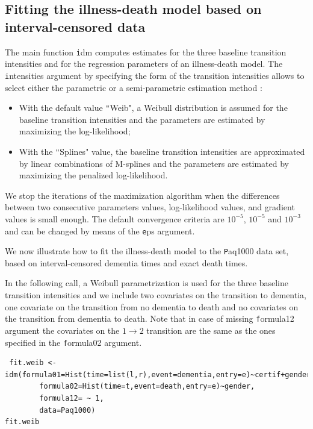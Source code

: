 \documentclass{article}
\newcommand{\code}[1]{{\texttt #1}}
\begin{document}
\subsection{Fitting the illness-death model based on interval-censored data}
\label{sec-5-3}

The main function \code{idm} computes estimates for the three baseline
transition intensities and for the regression parameters of an
illness-death model.  The \code{intensities} argument by specifying
the form of the transition intensities allows to select either the
parametric or a semi-parametric estimation method :

\begin{itemize}
\item With the default value \code{"Weib"}, a Weibull distribution is
assumed for the baseline transition intensities and the parameters
are estimated by maximizing the log-likelihood;
\item With the \code{"Splines"} value, the baseline transition
intensities are approximated by linear combinations of
M-splines and the parameters are estimated by
maximizing the penalized log-likelihood.
\end{itemize}

We stop the iterations of the maximization algorithm when the differences 
between two consecutive
parameters values, log-likelihood values, and gradient values is small
enough.  The default convergence criteria are $10^{-5}$, $10^{-5}$ and
$10^{-3}$ and can be changed by means of the \code{eps} argument.

We now illustrate how to fit the illness-death model to the 
\code{Paq1000} data set, based on 
interval-censored dementia times and exact death times.

\bigskip

In the following call, a Weibull parametrization is used for the three baseline 
transition intensities and we include two covariates on the transition to dementia,
one covariate on the transition from no dementia to death and no covariates 
on the transition from dementia to death. Note that in case of missing \code{formula12}
argument the covariates on the $1 \rightarrow 2$ transition are the same as 
the ones specified in the  \code{formula02} argument.

\lstset{basicstyle=\small\tt,numbers=left,language=R}
\begin{lstlisting}
 fit.weib <- idm(formula01=Hist(time=list(l,r),event=dementia,entry=e)~certif+gender,
		formula02=Hist(time=t,event=death,entry=e)~gender,
		formula12= ~ 1,
		data=Paq1000)
fit.weib
\end{lstlisting}
\end{document}

